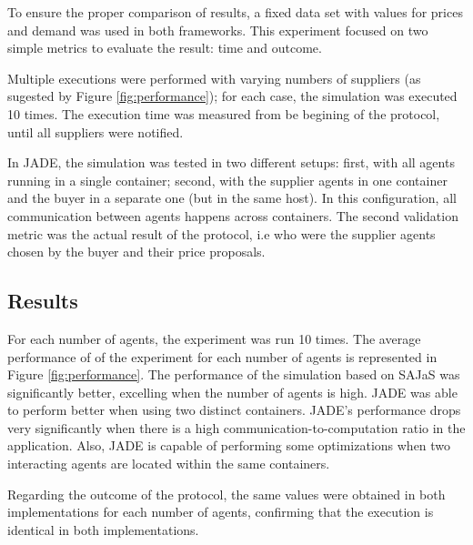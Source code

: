 To ensure the proper comparison of results, a fixed data set with values for prices and demand was used in both frameworks. This experiment focused on two simple metrics to evaluate the result: time and outcome. 

Multiple executions were performed with varying numbers of suppliers (as sugested by Figure \ref{fig:performance}); for each case, the simulation was executed 10 times. The execution time was measured from be begining of the protocol, until all suppliers were notified.

In JADE, the simulation was tested in two different setups: first, with all agents running in a single container; second, with the supplier agents in one container and the buyer in a separate one (but in the same host). In this configuration, all communication between agents happens across containers. The second validation metric was the actual result of the protocol, i.e who were the supplier agents chosen by the buyer and their price proposals.

\subsection{Results}

For each number of agents, the experiment was run 10 times. The average performance of of the experiment for each number of agents is represented in Figure \ref{fig:performance}. The performance of the simulation based on SAJaS was significantly better, excelling when the number of agents is high. JADE was able to perform better when using two distinct containers. JADE's performance drops very significantly when there is a high communication-to-computation ratio in the application. Also, JADE is capable of performing some optimizations when two interacting agents are located within the same containers\cite{mengistu2008scalability}.

Regarding the outcome of the protocol, the same values were obtained in both implementations for each number of agents, confirming that the execution is identical in both implementations.

